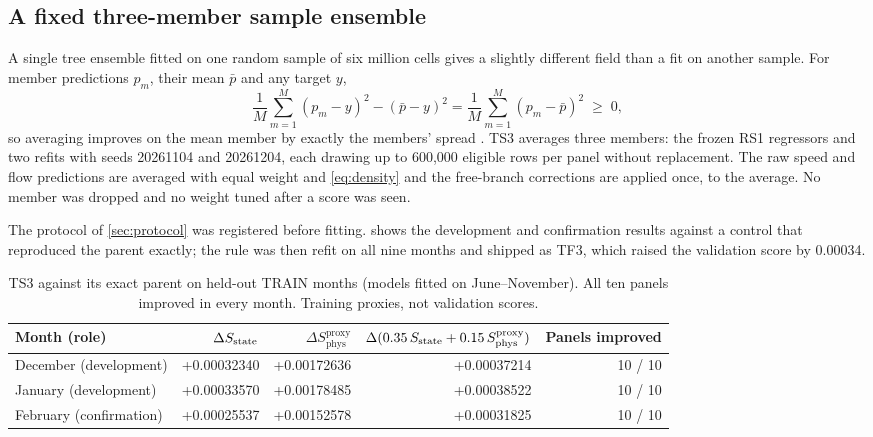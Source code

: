 \subsection{A fixed three-member sample ensemble}\label{sec:ensemble}
A single tree ensemble fitted on one random sample of six million cells gives a slightly different field than a
fit on another sample. For member predictions $p_m$, their mean $\bar p$ and any target $y$,
\begin{equation}
  \frac1M\sum_{m=1}^M (p_m-y)^2 - (\bar p-y)^2 = \frac1M\sum_{m=1}^M (p_m-\bar p)^2 \;\ge\; 0,
  \label{eq:ambiguity}
\end{equation}
so averaging improves on the mean member by exactly the members' spread \cite{breiman1996}. TS3 averages three
members: the frozen RS1 regressors and two refits with seeds 20261104 and 20261204, each drawing up to 600,000
eligible rows per panel without replacement. The raw speed and flow predictions are averaged with equal weight
and \cref{eq:density} and the free-branch corrections are applied once, to the average. No member was dropped and
no weight tuned after a score was seen.

The protocol of \cref{sec:protocol} was registered before fitting.  shows the development and
confirmation results against a control that reproduced the parent exactly; the rule was then refit on all nine
months and shipped as TF3, which raised the validation score by 0.00034.

\begin{table}[h]
\centering\small
\caption{TS3 against its exact parent on held-out TRAIN months (models fitted on June--November). All ten panels
improved in every month. Training proxies, not validation scores.}\label{tab:ts3}
\begin{tabular}{@{}l r r r r@{}}
\toprule
Month (role) & $\Delta S_{\mathrm{state}}$ & $\Delta S_{\mathrm{phys}}^{\mathrm{proxy}}$ & $\Delta(0.35\,S_{\mathrm{state}}+0.15\,S_{\mathrm{phys}}^{\mathrm{proxy}})$ & Panels improved \\
\midrule
December (development) & +0.00032340 & +0.00172636 & +0.00037214 & 10 / 10 \\
January (development)  & +0.00033570 & +0.00178485 & +0.00038522 & 10 / 10 \\
February (confirmation) & +0.00025537 & +0.00152578 & +0.00031825 & 10 / 10 \\
\bottomrule
\end{tabular}
\end{table}

